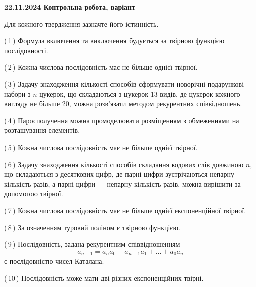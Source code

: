 \documentclass[12pt, ukrainian]{article}
\begin{document}
\begin {large}
\begin {large}
\begin {large}
\begin {large}
\begin {large}
\begin {large}
\begin {large}
\begin {large}

\textbf{22.11.2024 Контрольна робота, варіант  }\par


{
Для кожного твердження зазначте його істинність.\par

\vspace{2mm}

(\,1\,) Формула включення та виключення будується за твірною функцією послідовності.%



(\,2\,) Кожна числова послідовність має не більше однієї твірної.%



(\,3\,) Задачу знаходження кількості способів сформувати новорічні подарункові набори з $n$ цукерок, що складаються з цукерок 13 видів, де цукерок кожного вигляду не більше 20, можна розв’язати методом рекурентних співвідношень.%



(\,4\,) Паросполучення можна промоделювати розміщенням з обмеженнями на розташування елементів.%



(\,5\,) Кожна числова послідовність має не більше однієї твірної.%



(\,6\,) Задачу знаходження кількості способів складання кодових слів довжиною $n$, що складаються з десяткових цифр, де парні цифри зустрічаються непарну кількість разів, а парні цифри — непарну кількість разів, можна вирішити за допомогою твірної.%



(\,7\,) Кожна числова послідовність має не більше однієї  експоненційної твірної.%



(\,8\,) За означенням туровий поліном є твірною функцією.%



(\,9\,) Послідовність, задана рекурентним співвідношенням $$a_{n+1}=a_{n}a_{0}+a_{n-1}a_{1}+\ldots+a_0a_{n}$$ є послідовністю чисел Каталана.%



(\,10\,) Послідовність може мати дві різних експоненційних твірні.%




\vspace{5mm}
}
\newpage

\begin {large}


\end{large}
\end{large}
\end{large}
\end{large}
\end{large}
\end{large}
\end{large}
\end{large}
\end{large}
\end{document}
